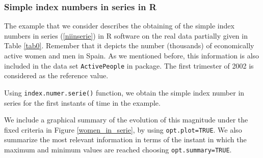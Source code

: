 \subsubsection{Simple index numbers in series in R}

The example that we consider describes the obtaining of the simple index numbers  in series (\ref{niinserie}) in R software on the real data partially given in Table \ref{tab0}. Remember that it depicts the number (thousands) of economically active women and men in Spain. As we mentioned before, this information is also included in the data set \verb|ActivePeople| in  package. The first trimester of 2002  is considered as the reference value. 

Using \verb|index.numer.serie()| function, we obtain the simple index number in series for the first instants of time  in the example. 


We include a graphical summary of the evolution of this magnitude under the fixed criteria in Figure \ref{women_in_serie}, by using \verb|opt.plot=TRUE|. We also summarize the most relevant information in terms of the instant in which the maximum and minimum values are reached choosing \verb|opt.summary=TRUE|.

